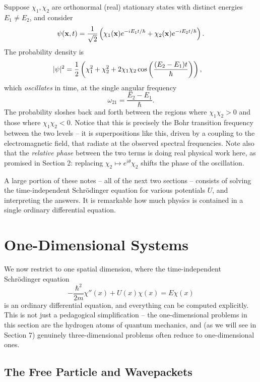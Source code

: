 \documentclass[a4paper]{scrartcl}
\begin{document}
\begin{example}
    Suppose $\chi_1, \chi_2$ are orthonormal (real) stationary states with distinct energies $E_1 \neq E_2$, and consider
    $$
    \psi(\mathbf{x}, t) = \frac{1}{\sqrt{2}}\left( \chi_1(\mathbf{x}) e^{-iE_1 t/\hbar} + \chi_2(\mathbf{x}) e^{-i E_2 t/\hbar} \right).
    $$
    The probability density is
    \begin{align*}
        \lvert\psi\rvert^2 &= \frac{1}{2}\left( \chi_1^2 + \chi_2^2 + 2 \chi_1 \chi_2 \cos\left( \frac{(E_2 - E_1) t}{\hbar} \right) \right),
    \end{align*}
    which \emph{oscillates} in time, at the single angular frequency
    $$
    \omega_{21} = \frac{E_2 - E_1}{\hbar}.
    $$
    The probability sloshes back and forth between the regions where $\chi_1 \chi_2 > 0$ and those where $\chi_1 \chi_2 < 0$. Notice that this is precisely the Bohr transition frequency between the two levels -- it is superpositions like this, driven by a coupling to the electromagnetic field, that radiate at the observed spectral frequencies. Note also that the \emph{relative phase} between the two terms is doing real physical work here, as promised in Section 2: replacing $\chi_2 \mapsto e^{i\theta}\chi_2$ shifts the phase of the oscillation.
\end{example}

A large portion of these notes -- all of the next two sections -- consists of solving the time-independent Schr\"odinger equation for various potentials $U$, and interpreting the answers. It is remarkable how much physics is contained in a single ordinary differential equation.

\section{One-Dimensional Systems}

We now restrict to one spatial dimension, where the time-independent Schr\"odinger equation
$$
-\frac{\hbar^2}{2m} \chi''(x) + U(x) \chi(x) = E \chi(x)
$$
is an ordinary differential equation, and everything can be computed explicitly. This is not just a pedagogical simplification -- the one-dimensional problems in this section are the hydrogen atoms of quantum mechanics, and (as we will see in Section 7) genuinely three-dimensional problems often reduce to one-dimensional ones.

\subsection{The Free Particle and Wavepackets}
\end{document}
